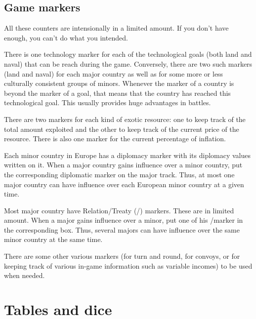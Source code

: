 \subsection{Game markers}

\aparag All these counters are intensionally in a limited amount. If you don't
have enough, you can't do what you intended.

\aparag[Technology] There is one technology marker for each of the
technological goals (both land and naval) that can be reach during the game.
\bparag Conversely, there are two such markers (land and naval) for each major
country as well as for some more or less culturally consistent groups of
minors.
\bparag Whenever the marker of a country is beyond the marker of a goal, that
means that the country has reached this technological goal. This usually
provides huge advantages in battles.

 There are two markers for each kind of exotic
resource: one to keep track of the total amount exploited and the other to
keep track of the current price of the resource.
\bparag There is also one marker for the current percentage of inflation.

 Each minor country in Europe has a diplomacy
marker with its diplomacy values written on it.
\bparag When a major country gains influence over a minor country, put the
corresponding diplomatic marker on the major track.
\bparag Thus, at most one major country can have influence over each European
minor country at a given time.

 Most major country have Relation/Treaty
(\dipFR/\dipAT) markers. These are in limited amount.
\bparag When a major gains influence over a \ROTW minor, put one of his
\dipFR/\dipAT marker in the corresponding box.
\bparag Thus, several majors can have influence over the same \ROTW minor
country at the same time.

 There are some other various markers (for turn and
round, for convoys, or for keeping track of various in-game information such
as variable incomes) to be used when needed.




\section{Tables and dice}




